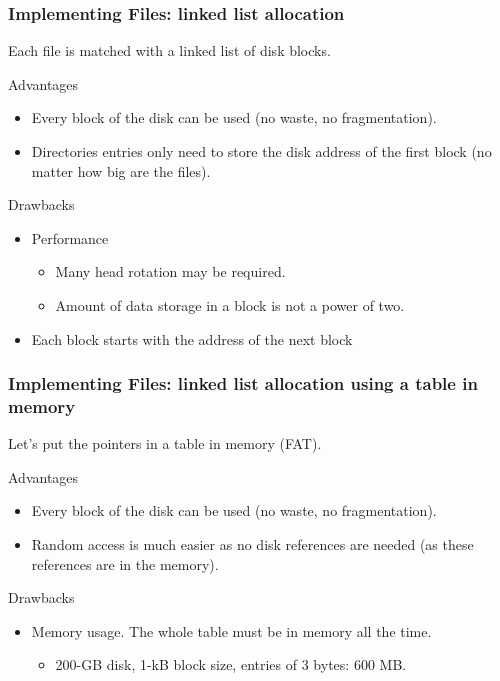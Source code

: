 \begin{frame}
    \frametitle{Implementing Files: linked list allocation}
    Each file is matched with a linked list of disk blocks.
    \begin{block}{Advantages}
        \begin{itemize}
            \item Every block of the disk can be used (no waste, no fragmentation).
            \item Directories entries only need to store the disk address of the first block (no matter how big are the files).
        \end{itemize}
    \end{block}
    \begin{block}{Drawbacks}
        \begin{itemize}
            \item Performance
                \begin{itemize}
                    \item Many head rotation may be required.
                    \item Amount of data storage in a block is not a power of two.%
                \end{itemize}
            \item Each block starts with the address of the next block%
        \end{itemize}
    \end{block}
\end{frame}

\begin{frame}
    \frametitle{Implementing Files: linked list allocation using a table in memory}
    Let's put the pointers in a table in memory (FAT).
    \begin{block}{Advantages}
        \begin{itemize}
            \item Every block of the disk can be used (no waste, no fragmentation).
            \item Random access is much easier as no disk references are needed (as these references are in the memory).
        \end{itemize}
    \end{block}
    \begin{block}{Drawbacks}
        \begin{itemize}
            \item Memory usage. The whole table must be in memory all the time.
                \begin{itemize}
                    \item 200-GB disk, 1-kB block size, entries of 3 bytes: 600 MB.
                \end{itemize}
        \end{itemize}
    \end{block}
\end{frame}

